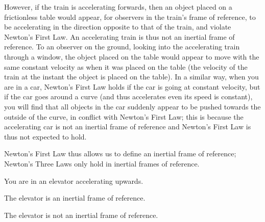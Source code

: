 However, if the train is accelerating forwards, then an object placed on a frictionless table would appear, for observers in the train's frame of reference, to be accelerating in the direction opposite to that of the train, and violate Newton's First Law. An accelerating train is thus not an inertial frame of reference. To an observer on the ground, looking into the accelerating train through a window, the object placed on the table would appear to move with the same constant velocity as when it was placed on the table (the velocity of the train at the instant the object is placed on the table). In a similar way, when you are in a car, Newton's First Law holds if the car is going at constant velocity, but if the car goes around a curve (and thus accelerates even its speed is constant), you will find that all objects in the car suddenly appear to be pushed towards the outside of the curve, in conflict with Newton's First Law; this is because the accelerating car is not an inertial frame of reference and Newton's First Law is thus not expected to hold.

Newton's First Law thus allows us to define an inertial frame of reference; Newton's Three Laws only hold in inertial frames of reference.

\begin{checkpoint}
\begin{MCquestion}{You are in an elevator accelerating upwards.}
\item The elevator is an inertial frame of reference.
\item The elevator is not an inertial frame of reference.\correct
\end{MCquestion}
\end{checkpoint}

